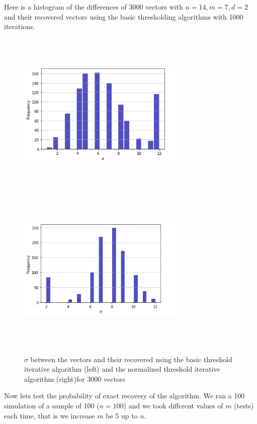 Here is a histogram of the differences of 3000 vectors with $ n = 14, m= 7, d = 2 $ and their recovered vectors using the basic thresholding algorithms with 1000 iterations. 
\vspace{5mm}
\begin{figure}[H]
	\includegraphics[height=8cm, width=8cm]{images/hamming_basic}
	\includegraphics[height=8cm, width=8cm]{images/n_hamming}
	\caption{$ \sigma $ between the vectors and their recovered using the basic threshold iterative algorithm (left) and the normalized threshold iterative algorithm (right)for 3000 vectors}
\end{figure}

Now lets test the probability of exact recovery of the algorithm. We ran a 100 simulation of a sample of 100 ($ n =100 $) and we took different values of $ m $ (tests) each time, that is we increase $ m $ be 5 up to $ n $.    

